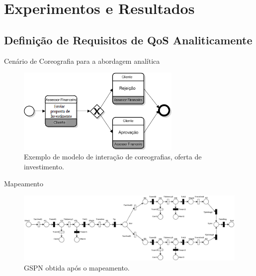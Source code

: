\documentclass[xcolor=svgnames]{beamer}
\begin{document}
\section{Experimentos e Resultados}
\subsection{ Definição de Requisitos de QoS Analiticamente}

  \begin{frame}{Cenário de Coreografia para a abordagem analítica}
    \begin{figure}[!h]
	\centering
	\includegraphics[width=0.7\textwidth]{figures/Example-InteractionChor-br.png}
	\caption{Exemplo de modelo de interação de coreografias, oferta de investimento. }%
	\label{fig:Example-InteractionChor}
    \end{figure}
  \end{frame}

  \begin{frame}{Mapeamento}
    \begin{figure}[!h]
    	\centering
    	\includegraphics[width=1.0\textwidth]{BPMNChoreographyExample-QoS.png}
    	\caption{GSPN obtida após o mapeamento.}
    \end{figure}
  \end{frame}
\end{document}
